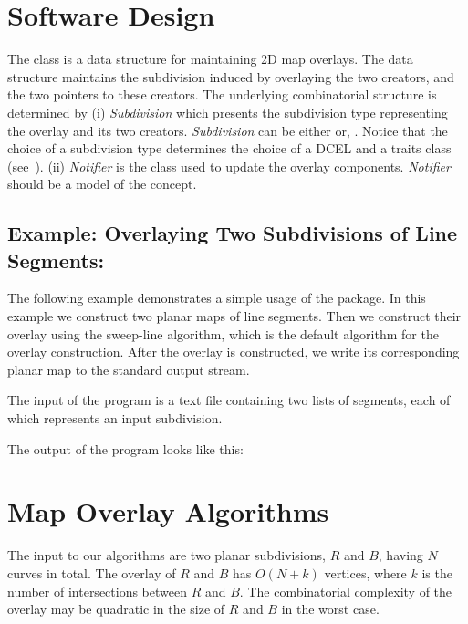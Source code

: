 \begin{ccTexOnly}

\section{Software Design}
The  class 
is a data structure for maintaining 2D map overlays.
The data structure maintains the subdivision induced by overlaying 
the two creators, and the two pointers to these creators. 
The underlying combinatorial structure is determined by
(i) {\it Subdivision} which presents the subdivision type 
representing the overlay and its two creators. 
{\it Subdivision} can be either  or, 
 .
Notice that the choice of a subdivision type determines the choice 
of a DCEL and a traits class (see~).
(ii) {\it Notifier} is the class used to update the overlay components. 
{\it Notifier} should be a model of the 
 concept.

\subsection*{Example: Overlaying Two Subdivisions of Line Segments:}
The following example demonstrates a simple usage of the 
 package.
In this example we construct two planar maps of line segments. 
Then we construct their overlay using the sweep-line algorithm, which is 
the default algorithm for the overlay construction. 
After the overlay is constructed, we write its corresponding planar map to the 
standard output stream. 

The input of the program is a text file containing two lists of segments, 
each of which represents an input subdivision.

The output of the program looks like this:

\section{Map Overlay Algorithms}
\label{sec:algorithms}
The input to our algorithms are two planar subdivisions, 
$R$ and $B$, having $N$ curves in total. 
The overlay of $R$ and $B$ has $O(N+k)$ vertices, 
where $k$ is the number of intersections between $R$ and $B$.
The combinatorial complexity of the overlay may be quadratic 
in the size of $R$ and $B$ in the worst case.


\end{ccTexOnly}
